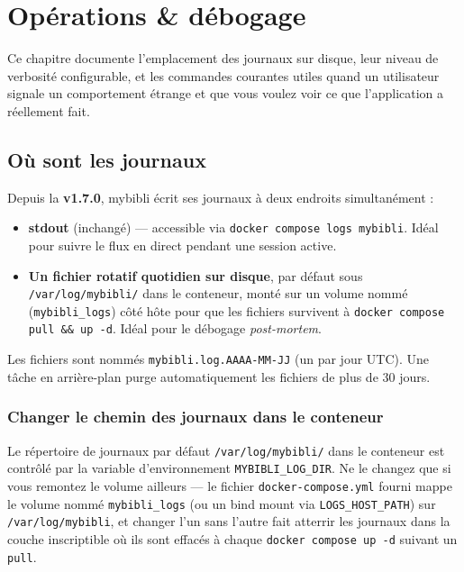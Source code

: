 \chapter{Opérations \& débogage}
\label{ch:operations-debugging}

Ce chapitre documente l'emplacement des journaux sur disque, leur
niveau de verbosité configurable, et les commandes courantes utiles
quand un utilisateur signale un comportement étrange et que vous
voulez voir ce que l'application a réellement fait.

\section{Où sont les journaux}
\label{sec:logs-location}

Depuis la \textbf{v1.7.0}, mybibli écrit ses journaux à deux endroits
simultanément :

\begin{itemize}
  \item \textbf{stdout} (inchangé) — accessible via
        \texttt{docker compose logs mybibli}. Idéal pour suivre le
        flux en direct pendant une session active.
  \item \textbf{Un fichier rotatif quotidien sur disque}, par défaut
        sous \texttt{/var/log/mybibli/} dans le conteneur, monté sur
        un volume nommé (\texttt{mybibli\_logs}) côté hôte pour que
        les fichiers survivent à \texttt{docker compose pull \&\&
        up -d}. Idéal pour le débogage \emph{post-mortem}.
\end{itemize}

Les fichiers sont nommés \texttt{mybibli.log.AAAA-MM-JJ} (un par jour
UTC). Une tâche en arrière-plan purge automatiquement les fichiers de
plus de 30 jours.

\subsection*{Changer le chemin des journaux dans le conteneur}
\label{sec:log-dir-override}

Le répertoire de journaux par défaut \texttt{/var/log/mybibli/} dans
le conteneur est contrôlé par la variable d'environnement
\texttt{MYBIBLI\_LOG\_DIR}. Ne le changez que si vous remontez le
volume ailleurs — le fichier \texttt{docker-compose.yml} fourni
mappe le volume nommé \texttt{mybibli\_logs} (ou un bind mount via
\texttt{LOGS\_HOST\_PATH}) sur \texttt{/var/log/mybibli}, et changer
l'un sans l'autre fait atterrir les journaux dans la couche
inscriptible où ils sont effacés à chaque
\texttt{docker compose up -d} suivant un \texttt{pull}.

